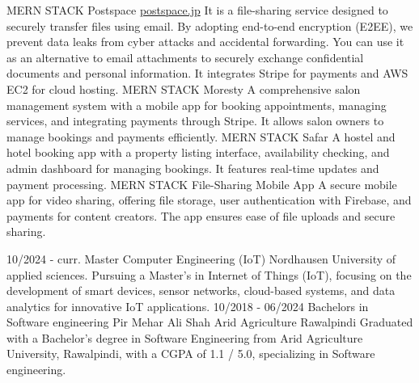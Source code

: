 \documentclass[9pt]{developercv}
\begin{document}
\begin{entrylist}
    \entry
    {MERN STACK}
    {Postspace}
    {\href{https://postspace.jp/}{postspace.jp}}
    {It is a file-sharing service designed to securely transfer files using email. By adopting end-to-end encryption (E2EE), we prevent data leaks from cyber attacks and accidental forwarding. You can use it as an alternative to email attachments to securely exchange confidential documents and personal information. It integrates Stripe for payments and AWS EC2 for cloud hosting.}
    \entry
    {MERN STACK}
    {Moresty}
    {}
    {A comprehensive salon management system with a mobile app for booking appointments, managing services, and integrating payments through Stripe. It allows salon owners to manage bookings and payments efficiently.}
    \entry
    {MERN STACK}
    {Safar}
    {}
    {A hostel and hotel booking app with a property listing interface, availability checking, and admin dashboard for managing bookings. It features real-time updates and payment processing.}
    \entry
    {MERN STACK}
    {File-Sharing Mobile App}
    {}
    {A secure mobile app for video sharing, offering file storage, user authentication with Firebase, and payments for content creators. The app ensures ease of file uploads and secure sharing.}
\end{entrylist}

\vspace{-10 pt}
\begin{entrylist}
    \entry
    {10/2024 - curr.}
    {Master Computer Engineering (IoT) }
    {Nordhausen University of applied sciences.}
    {Pursuing a Master's in Internet of Things (IoT), focusing on the development of smart devices, sensor networks, cloud-based systems, and data analytics for innovative IoT applications.}
    \entry
    {10/2018 - 06/2024}
    {Bachelors in Software engineering}
    {Pir Mehar Ali Shah Arid Agriculture Rawalpindi}
    {Graduated with a Bachelor's degree in Software Engineering from Arid Agriculture University, Rawalpindi, with a CGPA of 1.1 / 5.0, specializing in Software engineering.}

\end{entrylist}
\end{document}
